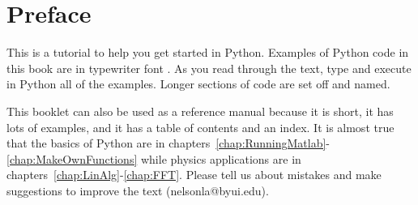 \chapter*{Preface}

This is a tutorial to help you get started in Python. Examples of
Python code in this book are in typewriter font . As you read through the text, type and execute in Python all
of the examples. Longer sections of code
are set off and named.

This booklet can also be used as a reference manual because it is
short, it has lots of examples, and it has a table of contents and
an index. It is almost true that the basics of Python are in
chapters~\ref{chap:RunningMatlab}-\ref{chap:MakeOwnFunctions} while
physics applications are in
chapters~\ref{chap:LinAlg}-\ref{chap:FFT}. Please tell us about
mistakes and make suggestions to improve the text
(nelsonla@byui.edu).

